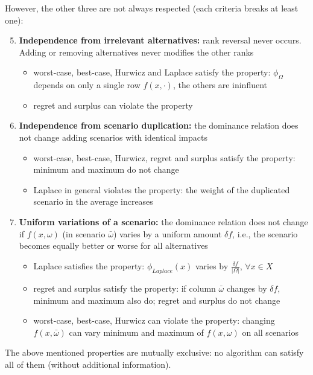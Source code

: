 However, the other three are not always respected (each criteria breaks at least one):
\begin{enumerate}
	\setcounter{enumi}{4}
	\item \textbf{Independence from irrelevant alternatives:} rank reversal never occurs. Adding or removing alternatives never modifies the other ranks
	\begin{itemize}
		\item worst-case, best-case, Hurwicz and Laplace satisfy the property: $\phi_\Omega$ depends on only a single row $f(x, \cdot)$, the others are ininfluent
		
		\item regret and surplus can violate the property
	\end{itemize}
	
	\item \textbf{Independence from scenario duplication:} the dominance relation does not change adding scenarios with identical impacts
	\begin{itemize}
		\item worst-case, best-case, Hurwicz, regret and surplus satisfy the property: minimum and maximum do not change
		
		\item Laplace in general violates the property: the weight of the duplicated scenario in the average increases
	\end{itemize}
	
	\item \textbf{Uniform variations of a scenario:} the dominance relation does not change if $f(x, \omega)$ (in scenario $\bar \omega$) varies by a uniform amount $\delta f$, i.e., the scenario becomes equally better or worse for all alternatives
	\begin{itemize}
		\item Laplace satisfies the property: $\phi_{Laplace} (x)$ varies by $\frac{\delta f}{|\Omega|}$, $\forall x \in X$
		
		\item regret and surplus satisfy the property: if column $\bar \omega$ changes by $\delta f$, minimum and maximum also do; regret and surplus do not change
		
		\item worst-case, best-case, Hurwicz can violate the property: changing $f(x, \bar \omega)$ can vary minimum and maximum of $f(x, \omega)$ on all scenarios \\
	\end{itemize}
\end{enumerate}

\begin{theo}
	The above mentioned properties are mutually exclusive: no algorithm can satisfy all of them (without additional information).
\end{theo}

